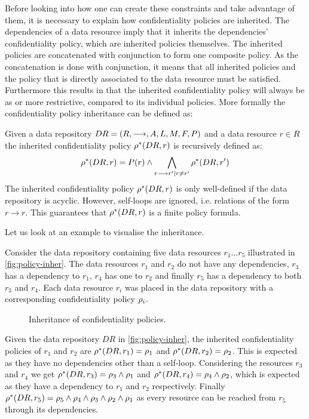 Before looking into how one can create these constraints and take advantage of them, it is necessary to explain how confidentiality policies are inherited. The dependencies of a data resource imply that it inherits the dependencies' confidentiality policy, which are inherited policies themselves. The inherited policies are concatenated with conjunction to form one composite policy. As the concatenation is done with conjunction, it means that all inherited policies and the policy that is directly associated to the data resource must be satisfied. Furthermore this results in that the inherited confidentiality policy will always be as or more restrictive, compared to its individual policies. More formally the confidentiality policy inheritance can be defined as:
\begin{definition}\label{def:cpi}
Given a data repository $DR= \left( R, \longrightarrow, A, L, M, F, P \right)$ and a data resource $r \in R$ the inherited confidentiality policy $\rho^{\ast}(DR, r)$ is recursively defined as:
\begin{equation*}
    \rho^{\ast}(DR, r) = P(r) \land \bigwedge\limits_{r \longrightarrow r' \mid r \neq r'} \rho^{\ast}(DR, r')
\end{equation*}
The inherited confidentiality policy $\rho^{\ast}(DR, r)$ is only well-defined if the data repository is acyclic. However, self-loops are ignored, i.e. relations of the form $r \longrightarrow r$. This guarantees that $\rho^{\ast}(DR, r)$ is a finite policy formula.
\end{definition}

Let us look at an example to visualise the inheritance.
\begin{example}
Consider the data repository containing five data resources $r_1\ldots r_5$ illustrated in \autoref{fig:policy-inher}. The data resources $r_1$ and $r_2$ do not have any dependencies, $r_3$ has a dependency to $r_1$, $r_4$ has one to $r_2$ and finally $r_5$ has a dependency to both $r_3$ and $r_4$. Each data resource $r_i$ was placed in the data repository with a corresponding confidentiality policy $\rho_i$.
\begin{figure}[!ht]
    \begin{center}
        
        \caption{Inheritance of confidentiality policies.}
        \label{fig:policy-inher}
    \end{center}
\end{figure}
Given the data repository $DR$ in \autoref{fig:policy-inher}, the inherited confidentiality policies of $r_1$ and $r_2$ are $\rho^{\ast}(DR, r_1) = \rho_1$ and $\rho^{\ast}(DR, r_2) = \rho_2$. This is expected as they have no dependencies other than a self-loop. Considering the resources $r_3$ and $r_4$ we get $\rho^{\ast}(DR, r_3) = \rho_3 \land \rho_1$ and $\rho^{\ast}(DR, r_4) = \rho_4 \land \rho_2$, which is expected as they have a dependency to $r_1$ and $r_2$ respectively. Finally $\rho^{\ast}(DR, r_5) = \rho_5 \land \rho_4 \land \rho_3 \land \rho_2 \land \rho_1$ as every resource can be reached from $r_5$ through its dependencies.
\end{example}


